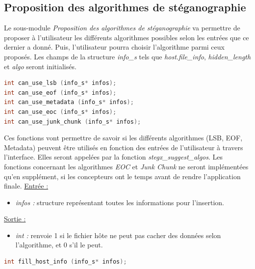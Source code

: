 \documentclass[11pt]{article}
\begin{document}
\subsection{Proposition des algorithmes 
de stéganographie}

Le sous-module \textit{Proposition des algorithmes de stéganographie} va 
permettre de proposer à l'utilisateur les différents algorithmes possibles 
selon les entrées que ce dernier a donné. Puis, l'utilisateur pourra choisir 
l'algorithme parmi ceux proposés.
Les champs de la structure \textit{info\_s} tels que \textit{host.file\_info}, 
\textit{hidden\_length} et \textit{algo} seront initialisés. 
\newline

\begin{lstlisting}[language=c]
int can_use_lsb (info_s* infos);
int can_use_eof (info_s* infos);
int can_use_metadata (info_s* infos);
int can_use_eoc (info_s* infos);
int can_use_junk_chunk (info_s* infos);
\end{lstlisting}

Ces fonctions vont permettre de savoir si les différents algorithmes 
(LSB, EOF, Metadata) peuvent être utilisés en fonction des entrées 
de l'utilisateur à travers l'interface. 
Elles seront appelées par la fonction \textit{stegx\_suggest\_algos}. 
Les fonctions concernant les algorithmes \textit{EOC} et \textit{Junk Chunk} 
ne seront implémentées qu'en supplément, si les concepteurs ont le temps 
avant de rendre l'application finale. 
\newline
\underline{Entrée :} 
\begin{itemize}
\item \textit{infos :} structure représentant toutes les informations pour 
l'insertion.  
\end{itemize}
\underline{Sortie :} 
\begin{itemize}
\item \textit{int :} renvoie 1 si le fichier hôte ne peut pas cacher des 
données selon l'algorithme, et 0 s'il le peut. 
\newline 
\end{itemize}

\begin{lstlisting}[language=c]
int fill_host_info (info_s* infos);
\end{lstlisting}
\end{document}
